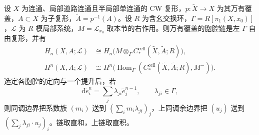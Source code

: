 \begin{theorem}\label{g2:thm:twisted-cellular-comparison}
	设 \(X\) 为连通、局部道路连通且半局部单连通的 CW 复形，\(p:\widetilde X\to X\) 为其万有覆盖，\(A\subset X\) 为子复形，\(\widetilde A=p^{-1}(A)\)。设 \(R\) 为含幺交换环，\(\Gamma=R[\pi_1(X,x_0)]\)，\(\mathcal L\) 为 \(R\) 模局部系统，\(M=\mathcal L_{x_0}\) 取本节的右作用。则万有覆盖的胞腔链是左 \(\Gamma\) 自由复形，并有
	\[
	\begin{aligned}
		H_n(X,A;\mathcal L)&\cong H_n\bigl(M\otimes_\Gamma C_*^{\mathrm{cell}}(\widetilde X,\widetilde A;R)\bigr),\\
		H^n(X,A;\mathcal L)&\cong H^n\bigl(\operatorname{Hom}_\Gamma(C_*^{\mathrm{cell}}(\widetilde X,\widetilde A;R),M^-)\bigr).
	\end{aligned}
	\]
	选定各胞腔的定向与一个提升后，若
	\[
		\mathrm d\widetilde e_i^n=\sum_j\lambda_{ji}\widetilde e_j^{n-1},\qquad \lambda_{ji}\in\Gamma,
	\]
	则同调边界把系数族 \((m_i)\) 送到 \((\sum_i m_i\lambda_{ji})_j\)，上同调余边界把 \((u_j)\) 送到 \((\sum_j\lambda_{ji}\cdot u_j)_i\)。链取直和，上链取直积。
\end{theorem}
